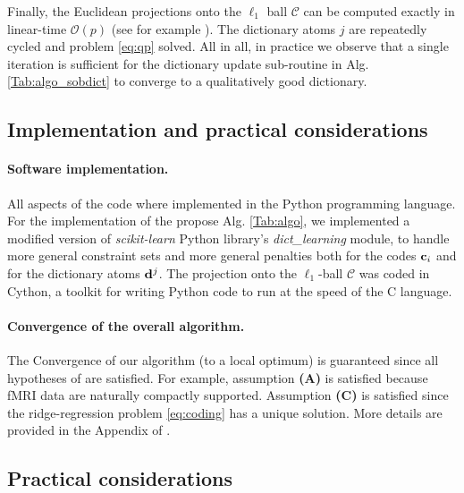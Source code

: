 Finally, the Euclidean projections onto the $\ell_1$ ball $\mathcal C$
can be computed exactly in linear-time $\mathcal O(p)$ (see for example
  \citep{condat2014fast,duchi2008efficient}).
The dictionary atoms $j$ are repeatedly cycled and problem \eqref{eq:qp} solved. %
All in all, in practice  we observe that a single iteration is sufficient
for the dictionary update sub-routine in Alg. \ref{Tab:algo_sobdict}
to converge to a qualitatively good dictionary.

\subsection{Implementation and practical considerations}

\paragraph{Software implementation.} All aspects of the code where
implemented in the Python programming language. 
For the implementation of the propose Alg. \ref{Tab:algo}, we
implemented a modified version of \textit{scikit-learn} Python library's
  \textit{dict\_learning} module, to handle more general constraint sets
  and more general penalties both for the codes $\mathbf{c}_i$ and for the
  dictionary atoms $\mathbf{d}^j$. The projection onto the $\ell_1$-ball $\mathcal C$ was coded in Cython, a toolkit for writing Python code to run at the speed of the C language.

\paragraph*{Convergence of the overall algorithm.}
The Convergence of our algorithm (to a local optimum) is guaranteed since all hypotheses of   \citep{mairal2010} are satisfied. For example, assumption \textbf{(A)} is satisfied because fMRI data are naturally compactly supported. Assumption \textbf{(C)} is satisfied since the ridge-regression problem \eqref{eq:coding} has a unique solution. More details are provided in the
Appendix of   \citep{dohmatob2016}.

\subsection{Practical considerations}
